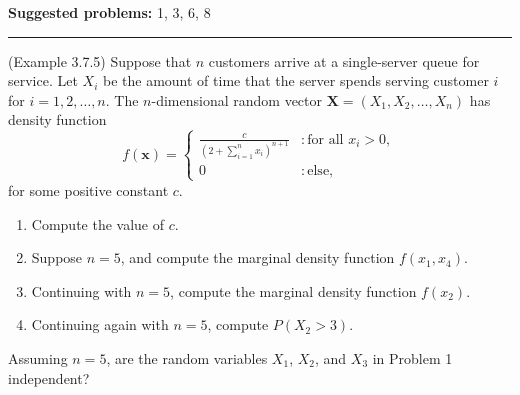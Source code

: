 \documentclass[12pt,reqno]{amsart}
\begin{document}
\textbf{Suggested problems:} 1, 3, 6, 8

\bigskip
\hrule

\bigskip
\prob (Example 3.7.5) Suppose that $n$ customers arrive at a single-server queue for service. Let $X_i$ be the amount of time that the server spends serving customer $i$ for $i=1,2,\ldots,n$. The $n$-dimensional random vector $\mathbf{X} = (X_1,X_2,\ldots,X_n)$ has density function
\[
	f(\mathbf{x}) = \begin{cases}
	\displaystyle\frac{c}{(2 + \sum_{i=1}^n x_i)^{n+1}} & : \text{for all $x_i>0$}, \\
	0 & : \text{else},
	\end{cases}
\]
for some positive constant $c$.

\medskip
\begin{enumerate}
\item Compute the value of $c$.\vfill
\item Suppose $n=5$, and compute the marginal density function $f(x_1,x_4)$.\vfill\newpage
\item Continuing with $n=5$, compute the marginal density function $f(x_2)$.\vfill
\item Continuing again with $n=5$, compute $P(X_2 > 3)$.\vfill
\end{enumerate}

\prob Assuming $n=5$, are the random variables $X_1$, $X_2$, and $X_3$ in Problem 1 independent?\vfill
\end{document}

